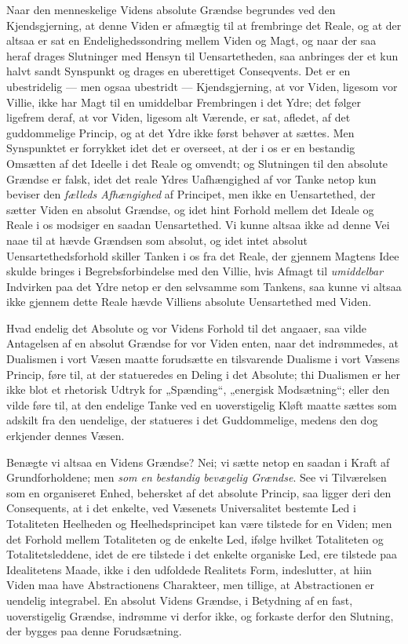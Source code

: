 \documentclass[12pt,a4paper]{book}
\newcommand{\opage}[1]{\marginnote{\footnotesize\textit{[#1]}}}
\begin{document}
Naar den menneskelige Videns absolute Grændse begrundes ved den Kjendsgjerning, at denne
Viden er afmægtig til at frembringe det Reale, og at der altsaa er sat en
Endelighedssondring mellem Viden og Magt, og naar der saa heraf drages Slutninger med
Hensyn til Uensartetheden, saa anbringes der et kun halvt sandt Synspunkt og drages en
uberettiget Conseqvents. Det er en ubestridelig --- men ogsaa ubestridt --- Kjendsgjerning,
at vor Viden, ligesom vor Villie, ikke har Magt til en umiddelbar Frembringen i det Ydre;
det følger ligefrem deraf, at vor Viden, ligesom alt Værende, er sat, afledet, af det
guddommelige Princip, og at det Ydre ikke først behøver at sættes. Men Synspunktet er
forrykket idet det er overseet, at der i os er en bestandig Omsætten af det Ideelle i det
Reale og omvendt; og Slutningen til den absolute Grændse er falsk, idet det reale Ydres
Uafhængighed af vor Tanke netop kun beviser den \emph{fælleds Afhængighed} af Principet,
men ikke en Uensartethed, der sætter Viden en absolut Grændse, og idet hint Forhold mellem
det Ideale og Reale i os modsiger en saadan Uensartethed. Vi kunne altsaa ikke ad denne Vei
naae til at hævde Grændsen som absolut, og idet intet absolut Uensartethedsforhold skiller
Tanken i os fra det Reale, der gjennem Magtens Idee skulde bringes i Begrebsforbindelse med
den Villie, hvis Afmagt til \emph{umiddelbar} Indvirken paa det Ydre netop er den selvsamme som
Tankens, saa kunne vi altsaa ikke gjennem dette Reale hævde Villiens absolute Uensartethed
med Viden.

\opage{160}Hvad endelig det Absolute og vor Videns Forhold til det angaaer, saa vilde Antagelsen af en
absolut Grændse for vor Viden enten, naar det indrømmedes, at Dualismen i vort Væsen maatte
forudsætte en tilsvarende Dualisme i vort Væsens Princip, føre til, at der statueredes en
Deling i det Absolute; thi Dualismen er her ikke blot et rhetorisk Udtryk for „Spænding“,
„energisk Modsætning“; eller den vilde føre til, at den endelige Tanke ved en uoverstigelig
Kløft maatte sættes som adskilt fra den uendelige, der statueres i det Guddommelige, medens
den dog erkjender dennes Væsen.

Benægte vi altsaa en Videns Grændse? Nei; vi sætte netop en saadan i Kraft af
Grundforholdene; men \emph{som en bestandig bevægelig Grændse}. See vi Tilværelsen som en
organiseret Enhed, behersket af det absolute Princip, saa ligger deri den Consequents, at i
det enkelte, ved Væsenets Universalitet bestemte Led i Totaliteten Heelheden og
Heelhedsprincipet kan være tilstede for en Viden; men det Forhold mellem Totaliteten og de
enkelte Led, ifølge hvilket Totaliteten og Totalitetsleddene, idet de ere tilstede i det
enkelte organiske Led, ere tilstede paa Idealitetens Maade, ikke i den udfoldede Realitets
Form, indeslutter, at hiin Viden maa have Abstractionens Charakteer, men tillige, at
Abstractionen er uendelig integrabel. En absolut Videns Grændse, i Betydning af en fast,
uoverstigelig Grændse, indrømme vi derfor ikke, og forkaste derfor den Slutning, der bygges
paa denne Forudsætning.
\end{document}
